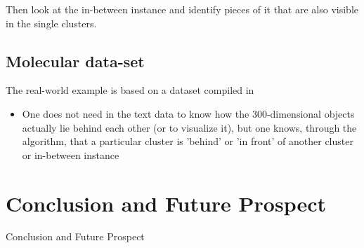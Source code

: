 \documentclass[11pt]{article}
\theoremstyle{definition}
\begin{document}
Then look at the in-between instance and identify pieces of it that are also visible in the single clusters.

\subsection{Molecular data-set}

The real-world example is based on a dataset compiled in \cite{mol2vec}

\begin{itemize}
    \item One does not need in the text data to know how the 300-dimensional objects actually lie behind each other (or to visualize it), but one knows, through the algorithm, that a particular cluster is 'behind' or 'in front' of another cluster or in-between instance
\end{itemize}

\section{Conclusion and Future Prospect}
Conclusion and Future Prospect

\newpage


\end{document}
